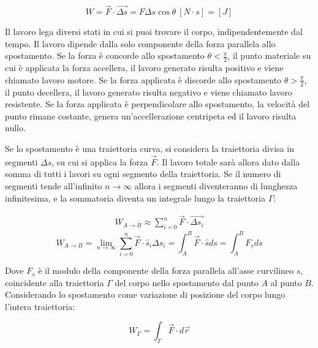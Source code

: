 \documentclass{article}
\numberwithin{equation}{subsection}
\begin{document}
\begin{equation}
    W=\vec{F}\cdot\vec{\Delta s}=F\Delta s\cos\theta\:\left[N\cdot s\right]=\left[J\right]
\end{equation}

Il lavoro lega diversi stati in cui si puoi trovare il corpo, 
indipendentemente dal tempo. Il lavoro dipende 
dalla solo componente della forza parallela allo spostamento. 
Se la forza è concorde allo spostamento $\theta<\displaystyle\frac{\pi}{2}$, il punto materiale su cui è applicata la forza accellera, il lavoro generato risulta positivo e viene chiamato lavoro motore. Se la 
forza applicata è discorde allo spostamento $\theta>\displaystyle\frac{\pi}{2}$, il punto decellera, il lavoro generato risulta negativo e viene chiamato lavoro resistente. 
Se la forza applicata è perpendicolare allo spostamento, la velocità del punto rimane costante, genera un'accellerazione centripeta ed il lavoro risulta nullo. 



Se lo spostamento è una traiettoria curva, si considera la 
traiettoria divisa in segmenti $\Delta s$, su cui si 
applica la forza $\vec{F}$. Il lavoro totale sarà allora dato 
dalla somma di tutti i lavori su ogni segmento della 
traiettoria. Se il numero di segmenti tende all'infinito $n\to\infty$ 
allora i segmenti diventeranno di lunghezza infinitesima, e la 
sommatoria diventa un integrale lungo la traiettoria $\Gamma$:

\begin{gather*}
    \displaystyle W_{A\to B}\approx\sum_{i=0}^{n}\vec{F}\cdot\vec{\Delta s_i}
\end{gather*}   
\begin{equation}
    W_{A\to B}=\lim_{n\to\infty}\sum_{i=0}^{n}\vec{F}\cdot\hat{s}_i{\Delta s_i}=\int_{A}^{B}\vec{F}\cdot\hat{s}ds=\int_{A}^{B}F_sds
\end{equation}

Dove $F_s$ è il modulo della componente della forza parallela 
all'asse curvilineo $s$, coincidente alla traiettoria $\Gamma$ 
del corpo nello spostamento dal punto $A$ al punto $B$.
Considerando lo spostamento come variazione di posizione 
del corpo lungo l'intera traiettoria:

\begin{equation}
    \displaystyle W_{\Gamma}=\int_{\Gamma}\vec{F}\cdot d\vec{r}
\end{equation}

\begin{center}\end{center}
\end{document}
